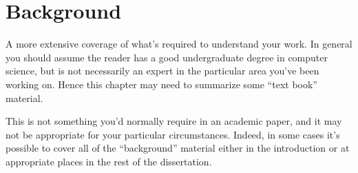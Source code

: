 \chapter{Background}

A more extensive coverage of what's required to understand your work.
In general you should assume the reader has a good undergraduate
degree in computer science, but is not necessarily an expert in the
particular area you've been working on. Hence this chapter may need to
summarize some ``text book'' material.

This is not something you'd normally require in an academic paper, and
it may not be appropriate for your particular circumstances. Indeed,
in some cases it's possible to cover all of the ``background''
material either in the introduction or at appropriate places in the
rest of the dissertation.